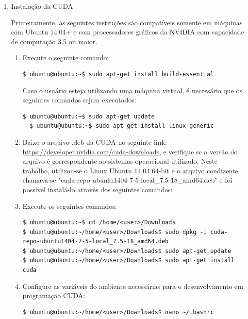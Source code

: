 \begin{enumerate}
 \item Instalação da CUDA
 
 Primeiramente, as seguintes instruções são compatíveis somente em máquinas com Ubuntu 14.04+ e com processadores gráficos da NVIDIA com capacidade de computação 3.5 ou maior. 
 \begin{enumerate}
  \item  Execute o seguinte comando:
  
\begin{lstlisting}[basicstyle=\tiny]
  $ ubuntu@ubuntu:~$ sudo apt-­get install build­-essential
\end{lstlisting}
  
Caso o usuário esteja utilizando uma máquina virtual, é necessário que os seguintes comandos sejam executados:

\begin{lstlisting}[basicstyle=\tiny]
  $ ubuntu@ubuntu:~$ sudo apt-get update
  $ ubuntu@ubuntu:~$ sudo apt-get install linux-generic
\end{lstlisting}

\item Baixe o arquivo .deb da CUDA no seguinte link: \url{https://developer.nvidia.com/cuda-downloads}, e verifique se a versão do arquivo é correspondente ao sistemas operacional utilizado. Neste trabalho, utilizou-se o Linux Ubuntu 14.04 64-bit e o arquivo condizente chamava-se "cuda-repo-ubuntu1404-7-5-local\_7.5-18\_amd64.deb" e foi possível instalá-lo através dos seguintes comandos:

\item Execute os seguintes comandos:

\begin{lstlisting}[basicstyle=\tiny]
$ ubuntu@ubuntu:~$ cd /home/<user>/Downloads
$ ubuntu@ubuntu:~/home/<user>/Downloads$ sudo dpkg -i cuda-repo-ubuntu1404-7-5-local_7.5-18_amd64.deb
$ ubuntu@ubuntu:~/home/<user>/Downloads$ sudo apt-get update
$ ubuntu@ubuntu:~/home/<user>/Downloads$ sudo apt-get install cuda

\end{lstlisting}

\item Configure as variáveis do ambiente necessárias para o desenvolvimento em programação CUDA:
 
\begin{lstlisting}[basicstyle=\tiny]
$ ubuntu@ubuntu:~/home/<user>/Downloads$ nano ~/.bashrc


\end{lstlisting}
\end{enumerate}
\end{enumerate}

